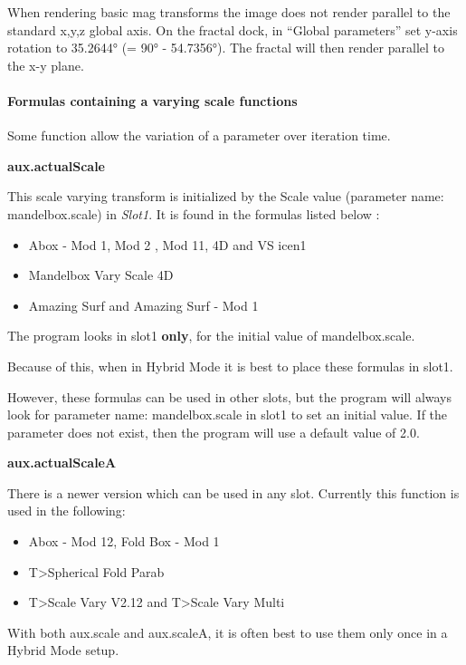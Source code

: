 When rendering basic mag transforms the image does not render parallel to the
standard x,y,z global axis. On the fractal dock, in ``Global parameters'' set
y-axis rotation to 35.2644° (= 90° - 54.7356°). The fractal will then render
parallel to the x-y plane.

\paragraph{Formulas containing a varying scale functions}

Some function allow the variation of a parameter over iteration time.


\textbf{aux.actualScale}

This scale varying transform is initialized by the Scale value (parameter name: mandelbox.scale) in \emph{Slot1}. It is found in the formulas listed below :

\begin{itemize}
	\item Abox - Mod 1, Mod 2 , Mod 11, 4D and  VS icen1
	\item Mandelbox Vary Scale 4D
	\item Amazing Surf  and Amazing Surf - Mod 1
\end{itemize}

The program looks  in slot1 \textbf{only}, for the initial value of  mandelbox.scale.

Because of this, when in Hybrid Mode it is best to place these formulas in slot1.

However, these formulas can be used in other slots, but the program will always look for parameter name: mandelbox.scale  in slot1 to set an initial value. If the parameter does not exist, then the program will use a default value of 2.0.


\textbf{aux.actualScaleA}

There is a newer version which can be used in any slot. Currently this function is used in  the following:

\begin{itemize}
	\item Abox - Mod 12, Fold Box - Mod 1
	\item T>Spherical Fold Parab
	\item T>Scale Vary V2.12 and T>Scale Vary Multi
	\end{itemize}
	
With both aux.scale and aux.scaleA, it is often best to use them only once in a Hybrid Mode setup.

